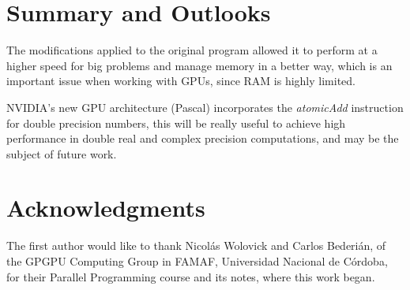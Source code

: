 \documentclass[english]{maciarticle}
\begin{document}





\section{Summary and Outlooks}
The modifications applied to the original program allowed it to perform at a higher speed for big problems and manage memory in a better way, which is an important issue when working with GPUs, since RAM is highly limited.

NVIDIA's new GPU architecture (Pascal) incorporates the \textit{atomicAdd} instruction for double precision numbers\cite{pascal}, this will be really useful to achieve high performance in double real and complex precision computations, and may be the subject of future work. 

\section*{Acknowledgments}
The first author would like to thank Nicol\'as Wolovick and Carlos Bederi\'an, of the
GPGPU Computing Group in FAMAF, Universidad Nacional de C\'ordoba, for their Parallel Programming course and its notes\cite{cp2016}, where this work began.
\end{document}
